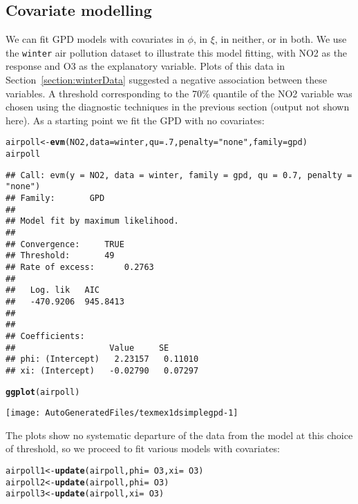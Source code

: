 \documentclass[10pt]{article}\usepackage[]{graphicx}\usepackage[]{color}
\makeatletter
\def\maxwidth{ %
  \ifdim\Gin@nat@width>\linewidth
    \linewidth
  \else
    \Gin@nat@width
  \fi
}
\newcommand{\hlnum}[1]{\textcolor[rgb]{0.686,0.059,0.569}{#1}}%
\newcommand{\hlstr}[1]{\textcolor[rgb]{0.192,0.494,0.8}{#1}}%
\newcommand{\hlopt}[1]{\textcolor[rgb]{0,0,0}{#1}}%
\newcommand{\hlstd}[1]{\textcolor[rgb]{0.345,0.345,0.345}{#1}}%
\newcommand{\hlkwb}[1]{\textcolor[rgb]{0.69,0.353,0.396}{#1}}%
\newcommand{\hlkwc}[1]{\textcolor[rgb]{0.333,0.667,0.333}{#1}}%
\newcommand{\hlkwd}[1]{\textcolor[rgb]{0.737,0.353,0.396}{\textbf{#1}}}%
\newenvironment{kframe}{%
 \def\at@end@of@kframe{}%
 \ifinner\ifhmode%
  \def\at@end@of@kframe{\end{minipage}}%
  \begin{minipage}{\columnwidth}%
 \fi\fi%
 \def\FrameCommand##1{\hskip\@totalleftmargin \hskip-\fboxsep
 \colorbox{shadecolor}{##1}\hskip-\fboxsep
     \hskip-\linewidth \hskip-\@totalleftmargin \hskip\columnwidth}%
 \MakeFramed {\advance\hsize-\width
   \@totalleftmargin\z@ \linewidth\hsize
   \@setminipage}}%
 {\par\unskip\endMakeFramed%
 \at@end@of@kframe}
\newenvironment{knitrout}{}{} %
\makeatother
\begin{document}
\subsection{Covariate modelling }
\label{section:covariateModels}
%
We can fit GPD models with covariates in $\phi$,
in $\xi$, in neither, or in both. We use the {\tt winter} air pollution dataset to illustrate this model fitting, with NO2 as the response and O3 as the explanatory variable. Plots of this data in Section~\ref{section:winterData} suggested a negative association between these variables. A threshold corresponding to the 70\% quantile of the NO2 variable was chosen using the diagnostic techniques in the previous section (output not shown here).  As a starting point we fit the GPD with no covariates:

\begin{knitrout}
\color{fgcolor}\begin{kframe}
\begin{alltt}
\hlstd{airpoll} \hlkwb{<-} \hlkwd{evm}\hlstd{(NO2,} \hlkwc{data}\hlstd{=winter,} \hlkwc{qu}\hlstd{=}\hlnum{.7}\hlstd{,} \hlkwc{penalty}\hlstd{=}\hlstr{"none"}\hlstd{,} \hlkwc{family}\hlstd{=gpd)}
\hlstd{airpoll}
\end{alltt}
\begin{verbatim}
## Call: evm(y = NO2, data = winter, family = gpd, qu = 0.7, penalty = "none")
## Family:       GPD 
## 
## Model fit by maximum likelihood.
## 
## Convergence:		TRUE
## Threshold:		49
## Rate of excess:		0.2763
## 
##   Log. lik   AIC     
##   -470.9206  945.8413
## 
## 
## Coefficients:
##                   Value     SE      
## phi: (Intercept)   2.23157   0.11010
## xi: (Intercept)   -0.02790   0.07297
\end{verbatim}
\begin{alltt}
\hlkwd{ggplot}\hlstd{(airpoll)}
\end{alltt}
\end{kframe}
\texttt{[image: AutoGeneratedFiles/texmex1dsimplegpd-1]} 

\end{knitrout}

 The plots show no systematic departure of the data from the model at this choice of threshold, so
we proceed to fit various models with covariates:

\begin{knitrout}
\color{fgcolor}\begin{kframe}
\begin{alltt}
\hlstd{airpoll1} \hlkwb{<-} \hlkwd{update}\hlstd{(airpoll,} \hlkwc{phi}\hlstd{=} \hlopt{~}\hlstd{O3,} \hlkwc{xi}\hlstd{=} \hlopt{~}\hlstd{O3)}
\hlstd{airpoll2} \hlkwb{<-} \hlkwd{update}\hlstd{(airpoll,} \hlkwc{phi}\hlstd{=} \hlopt{~}\hlstd{O3)}
\hlstd{airpoll3} \hlkwb{<-} \hlkwd{update}\hlstd{(airpoll,} \hlkwc{xi}\hlstd{=} \hlopt{~}\hlstd{O3)}
\end{alltt}
\end{kframe}
\end{knitrout}
\end{document}
